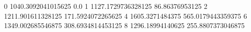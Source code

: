 0 1040.3092041015625 0.0
1 1127.1729736328125 86.86376953125
2 1211.901611328125 171.5924072265625
4 1605.3271484375 565.0179443359375
6 1349.002685546875 308.6934814453125
8 1296.18994140625 255.8807373046875
